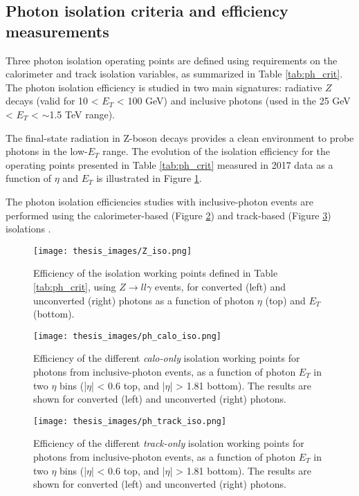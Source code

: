 \documentclass[a4paper, oneside, 11pt, openright]{book}
\begin{document}
			
			\subsection{Photon isolation criteria and efficiency measurements}
			Three photon isolation operating points are defined using requirements on the calorimeter and track isolation variables, as summarized in Table \ref{tab:ph_crit}. The photon isolation efficiency is studied in two main signatures: radiative $Z$ decays (valid for 10 < $E_T$ < 100 GeV) and inclusive photons (used in the 25 GeV < $E_T$ < $\sim$1.5 TeV range).
			
			The final-state radiation in Z-boson decays provides a clean environment to probe photons in the low-$E_T$ range. The evolution of the isolation efficiency for the operating points presented in Table \ref{tab:ph_crit} measured in 2017 data \cite{Aad_2019} as a function of $\eta$ and $E_T$ is illustrated in Figure \ref{fig:Z_iso}. 
			
			The photon isolation efficiencies studies with inclusive-photon events are performed using the calorimeter-based (Figure \ref{fig:ph_calo_iso}) and track-based (Figure \ref{fig:ph_tarck_iso}) isolations \cite{Aad_2019}.
			
			\begin{figure}
				\centering
				\texttt{[image: thesis\_images/Z\_iso.png]} 
				\caption{Efficiency of the isolation working points defined in Table \ref{tab:ph_crit}, using $Z\to ll\gamma$ events, for converted (left) and unconverted (right) photons as a function of photon $\eta$ (top) and $E_T$ (bottom).}
				\label{fig:Z_iso}
			\end{figure}
			\begin{figure}
				\centering
				\texttt{[image: thesis\_images/ph\_calo\_iso.png]} 
				\caption{Efficiency of the different \textit{calo-only} isolation working points for photons from inclusive-photon events, as a function of photon $E_T$ in two $\eta$ bins (|$\eta$| < 0.6 top, and |$\eta$| > 1.81 bottom). The results are shown for converted (left) and unconverted (right) photons.}
				\label{fig:ph_calo_iso}
			\end{figure}
			\begin{figure}
				\centering
				\texttt{[image: thesis\_images/ph\_track\_iso.png]} 
				\caption{Efficiency of the different \textit{track-only} isolation working points for photons from inclusive-photon events, as a function of photon $E_T$ in two $\eta$ bins (|$\eta$| < 0.6 top, and |$\eta$| > 1.81 bottom). The results are shown for converted (left) and unconverted (right) photons.}
				\label{fig:ph_tarck_iso}
			\end{figure}
			
\end{document}
